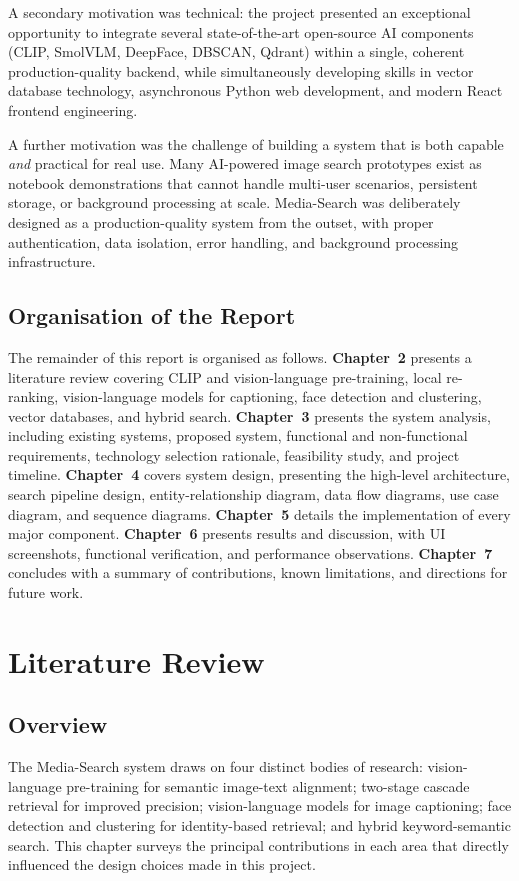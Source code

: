 \documentclass[12pt,a4paper,oneside]{report}
\begin{document}
A secondary motivation was technical: the project presented an exceptional
opportunity to integrate several state-of-the-art open-source AI components
(CLIP, SmolVLM, DeepFace, DBSCAN, Qdrant) within a single, coherent
production-quality backend, while simultaneously developing skills in vector
database technology, asynchronous Python web development, and modern React
frontend engineering.

A further motivation was the challenge of building a system that is both
capable \textit{and} practical for real use. Many AI-powered image search
prototypes exist as notebook demonstrations that cannot handle multi-user
scenarios, persistent storage, or background processing at scale.
Media-Search was deliberately designed as a production-quality system from the
outset, with proper authentication, data isolation, error handling, and
background processing infrastructure.

\section{Organisation of the Report}
The remainder of this report is organised as follows.
\textbf{Chapter~2} presents a literature review covering CLIP and
vision-language pre-training, local re-ranking, vision-language models for
captioning, face detection and clustering, vector databases, and hybrid search.
\textbf{Chapter~3} presents the system analysis, including existing systems,
proposed system, functional and non-functional requirements, technology
selection rationale, feasibility study, and project timeline.
\textbf{Chapter~4} covers system design, presenting the high-level
architecture, search pipeline design, entity-relationship diagram, data flow
diagrams, use case diagram, and sequence diagrams.
\textbf{Chapter~5} details the implementation of every major component.
\textbf{Chapter~6} presents results and discussion, with UI screenshots,
functional verification, and performance observations.
\textbf{Chapter~7} concludes with a summary of contributions, known
limitations, and directions for future work.

\chapter{Literature Review}

\section{Overview}
The Media-Search system draws on four distinct bodies of research:
vision-language pre-training for semantic image-text alignment; two-stage
cascade retrieval for improved precision; vision-language models for image
captioning; face detection and clustering for identity-based retrieval; and
hybrid keyword-semantic search. This chapter surveys the principal
contributions in each area that directly influenced the design choices
made in this project.
\end{document}
